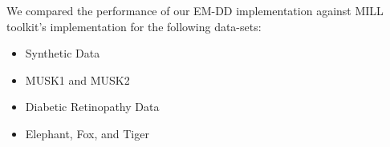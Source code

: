 \documentclass[conference]{IEEEtran}
\begin{document}
\begin{table}[]
\centering
\caption{Recall for Python EM-DD implementation on all data-sets, over the entire set}
\label{em-dd-recall-full}
\end{table}


We compared the performance of our EM-DD implementation against MILL toolkit's implementation for the following data-sets:
\begin{itemize}
    \item Synthetic Data\cite{SynthDataset}
    \item MUSK1\cite{MUSK1Dataset} and MUSK2\cite{MUSK2Dataset}
    \item Diabetic Retinopathy Data\cite{SynthDataset}
    \item Elephant, Fox, and Tiger\cite{andrews2002support}
\end{itemize}
\end{document}
